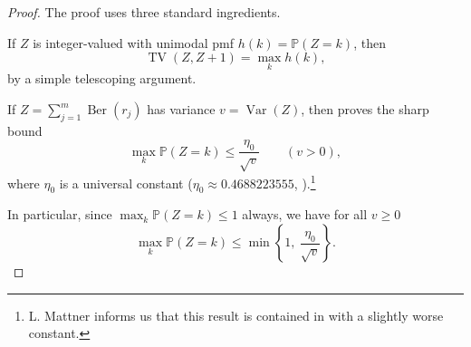 \documentclass[11pt]{amsart}
\theoremstyle{plain}
\theoremstyle{definition}
\DeclareMathOperator{\TV}{TV}
\DeclareMathOperator{\Ber}{Ber}
\DeclareMathOperator{\Var}{Var}
\renewcommand{\P}{\mathbb{P}}
\newcommand{\etaBCV}{\eta_0}
\begin{document}
\begin{proof}
The proof uses three standard ingredients.

If $Z$ is integer-valued with unimodal pmf $h(k)=\P(Z=k)$, then
\begin{equation}\label{eq:shift-TV-unimodal-thm}
\TV(Z,Z+1)=\max_k h(k),
\end{equation}
by a simple telescoping argument.

If $Z=\sum_{j=1}^m \Ber(r_j)$ has variance $v=\Var(Z)$, then
\cite[Theorem~1]{BAILLON_COMINETTI_VAISMAN_2016} proves the sharp bound
\begin{equation}\label{eq:pb-peak-bcv}
\max_k \P(Z=k)\le \frac{\etaBCV}{\sqrt{v}}
\qquad (v>0),
\end{equation}
where $\etaBCV$ is a universal constant
($\etaBCV\approx 0.4688223555$, \cite[Remark~1]{BAILLON_COMINETTI_VAISMAN_2016}).\footnote{
L. Mattner \cite{Mattner2026} informs us that
this result is contained in \cite{BarbourJensen1989LocalTailPoisson}
with a slightly worse constant.
}

In particular, since $\max_k\P(Z=k)\le 1$ always, we have for all $v\ge0$
\begin{equation}\label{eq:pb-peak-bcv-min}
\max_k \P(Z=k)\le \min\!\left\{1,\ \frac{\etaBCV}{\sqrt{v}}\right\}.
\end{equation}


\end{proof}
\end{document}
